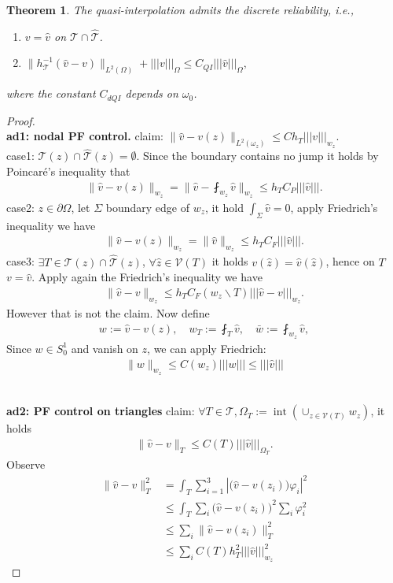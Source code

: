 \documentclass[a4paper,12pt,oneside,fleqn]{book}
\newtheorem{theorem}{Theorem}[section]
\theoremstyle{definition}
\theoremstyle{remark}
\DeclareMathOperator*{\interior}{int}
\begin{document}
\begin{theorem}
	The quasi-interpolation admits the discrete reliability, i.e., 
	\begin{enumerate}
		\item $v = \hat{v}$ on $\mathcal{T} \cap \hat{\mathcal{T}}$. 
		\item $\|h_\mathcal{T}^{-1}( \hat{v} - v)\|_{L^2(\Omega)} + ||| v|||_{\Omega} \le C_{QI} |||\hat{v}|||_\Omega,$
	\end{enumerate}
	where the constant $C_{dQI}$ depends on $\omega_0$. 
\end{theorem}
\begin{proof}\quad\\
\textbf{ad1: nodal PF control.} claim: $\|\hat{v} - v(z)\|_{L^2(\omega_z)} \le C h_T|||v|||_{w_z}$. \\
case1: $\mathcal{T}(z) \cap \hat{\mathcal{T}}(z) = \emptyset$. Since the boundary contains no jump it holds by Poincar\'e's inequality that 
\begin{align*}
	\|\hat{v} - v(z)\|_{w_z} = \|\hat{v} - \fint_{w_z} \hat{v}\|_{w_z} \le h_T C_P ||| \hat{v}|||.
\end{align*}
case2: $z \in \partial\Omega$, let $\Sigma$ boundary edge of $w_z$, it hold $\int_\Sigma \hat{v} = 0$, apply Friedrich's inequality we have
\begin{align*}
	\|\hat{v} - v(z)\|_{w_z} = \|\hat{v}\|_{w_z} \le h_T C_F |||\hat{v}|||.
\end{align*}
case3: $\exists T \in \mathcal{T}(z) \cap \hat{\mathcal{T}}(z)$, $\forall \hat{z} \in \mathcal{V}(T)$ it holds $v(\hat{z}) = \hat{v}(\hat{z})$, hence on $T$ $v = \hat{v}$. Apply again the Friedrich's inequality we have
\begin{align*}
	\|\hat{v} - v \|_{w_z} \le h_T C_F(w_z \backslash T) |||\hat{v} - v|||_{w_z}.
\end{align*}
However that is not the claim. Now define 
\begin{align*}
	w:= \hat{v} - v(z), \quad w_T:= \fint_T \hat{v}, \quad \bar{w}:= \fint_{w_z} \hat{v},
\end{align*}
Since $w \in S_0^1$ and vanish on $z$, we can apply Friedrich:
\begin{align*}
	\|w\|_{w_z} \le C(w_z) |||w||| \le |||\hat{v}|||
\end{align*}

\quad\\
\textbf{ad2: PF control on triangles} claim: $\forall T \in \mathcal{T}, \Omega_T := \interior(\cup_{z \in \mathcal{V} (T)} w_z)$, it holds
\begin{align*}
	\|\hat{v} - v\|_T \le C(T)|||\hat{v}|||_{\Omega_T}. 
\end{align*}
Observe 
\begin{align*}
	\| \hat{v} - v \|_T^2 &= \int_T \sum_{i = 1}^3 |\bigg( \hat{v} - v(z_i) \bigg) \varphi_i|^2 \\
	&\le \int_T \sum_i \bigg(\hat{v} - v(z_i)\bigg)^2 \sum_i \varphi_i^2 \\
	& \le \sum_i \|\hat{v} - v(z_i)\|_T^2 \\
	&\le \sum_i C(T) h_T^2 |||\hat{v}|||_{w_z}^2
\end{align*}


\end{proof}
\end{document}
